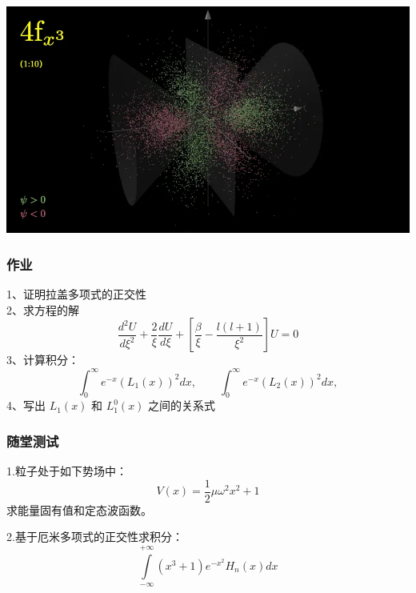 \begin{frame}
	\frametitle{}
  \begin{center}
	   \includegraphics[width=1\textwidth]{figs/2022-03-30-18-55-10.png}
  \end{center}
\end{frame}

\begin{frame}
	\frametitle{作业}
	1、证明拉盖多项式的正交性\\
	2、求方程的解
	\begin{equation*}
		\frac{d^2 U}{d \xi ^2} + \frac{2}{\xi }\frac{d U }{d \xi}  +[\frac{\beta}{\xi} - \frac{l(l+1)}{\xi ^2}] U=0
	\end{equation*}	 
	3、计算积分：
	\begin{equation*}
		\int_{0}^{\infty}   e^{-x} ( L_1 (x) )^2 dx, \qquad  \int_{0}^{\infty}   e^{-x} ( L_2 (x) )^2 dx, 
	\end{equation*}	
	4、写出 $L_1 (x)$ 和 $L_1 ^0 (x)$ 之间的关系式
\end{frame}		

\begin{frame}
	\frametitle{随堂测试}
	\begin{exampleblock} {1.粒子处于如下势场中：}
		\begin{equation*}
			V(x)= \frac{1}{2} \mu \omega ^2 x^2  +1
		\end{equation*}
		\hspace{2em}求能量固有值和定态波函数。
	\end{exampleblock}	
	\begin{exampleblock} {2.基于厄米多项式的正交性求积分：}
		\begin{equation*}
			\int\limits_{-\infty}^{+\infty} (x^3 +1)e^{-x^{2}} H_n(x) d x 
		\end{equation*}
	\end{exampleblock}	
\end{frame}


